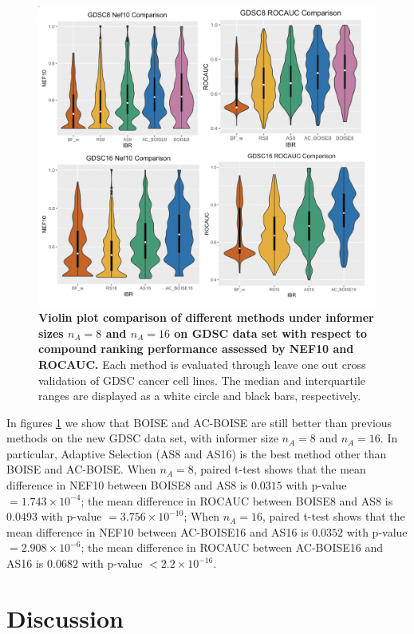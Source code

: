 \documentclass[12pt]{article}
\begin{document}
\begin{figure}[!ht]
\caption{\label{fig:gdsc} 
{\bf Violin plot comparison of different methods under informer sizes $n_A =8$ and $n_A = 16$ on GDSC data set with respect to compound ranking performance assessed by NEF10 and ROCAUC.} Each method is evaluated through leave one out cross validation of GDSC cancer cell lines. The median and interquartile ranges are displayed as a white circle and black bars, respectively.}
\centering
\includegraphics[width=5.0in]{GDSC.png}
\end{figure}

In figures \ref{fig:gdsc} we show that BOISE and AC-BOISE are still better than previous methods on the new GDSC data set, with informer size $n_A = 8$ and $n_A = 16$. In particular, Adaptive Selection (AS8 and AS16) is the best method other than BOISE and AC-BOISE. When $n_A = 8$, paired t-test shows that the mean difference in NEF10 between BOISE8 and AS8 is $0.0315$ with p-value $= 1.743\times 10^{-4}$; the mean difference in ROCAUC between BOISE8 and AS8 is $0.0493$ with p-value $= 3.756\times 10^{-10}$; When $n_A = 16$, paired t-test shows that the mean difference in NEF10 between AC-BOISE16 and AS16 is $0.0352$ with p-value $= 2.908\times 10^{-6}$; the mean difference in ROCAUC between AC-BOISE16 and AS16 is $0.0682$ with p-value $<2.2\times 10^{-16}$. 


\section{Discussion}
\end{document}
